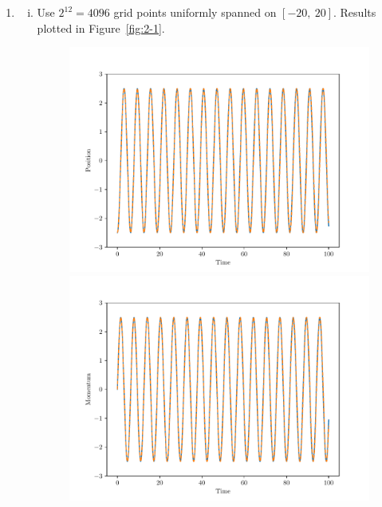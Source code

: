 \documentclass{article}
\begin{document}
\begin{enumerate}[1.]
  \item \begin{enumerate}[(i)]
    \item Use $2^{12} = 4096$ grid points uniformly spanned on $[-20,\ 20]$.  Results plotted in Figure~\ref{fig:2-1}.
    \begin{figure}[H]
      \centering
      \begin{minipage}{0.32\linewidth}
        \centering
        \includegraphics[width=\linewidth]{q2-1_time_position.pdf}
      \end{minipage}
      \begin{minipage}{0.32\linewidth}
        \centering
        \includegraphics[width=\linewidth]{q2-1_time_momentum.pdf}

\end{minipage}
\end{figure}
\end{enumerate}
\end{enumerate}
\end{document}
